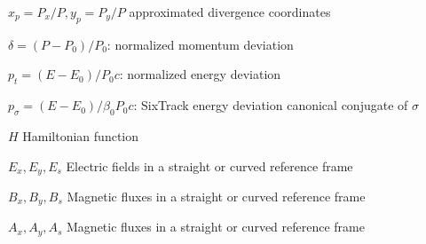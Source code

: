 \documentclass[english]{article}
\begin{document}
\begin{description}
\item $x_p=P_x/P,y_p=P_y/P$ approximated divergence coordinates
\item $\delta=(P-P_0)/P_0$: normalized momentum deviation
\item $p_t=(E-E_0)/P_0c$: normalized energy deviation
\item $p_\sigma=(E-E_0)/\beta_0 P_0c$: SixTrack energy deviation canonical conjugate of $\sigma$
\item $H$ Hamiltonian function
\item $E_x, E_y, E_s$ Electric fields in a straight or curved reference frame
\item $B_x, B_y, B_s$ Magnetic fluxes in a straight or curved reference frame
\item $A_x, A_y, A_s$ Magnetic fluxes in a straight or curved reference frame
\end{description}




\end{document}
